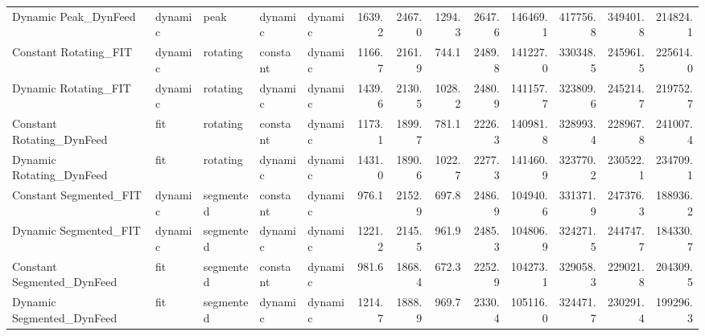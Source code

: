 \begin{tabular}{lllllrrrrrrrr}
Dynamic Peak\_DynFeed         &  dynamic &         peak &   dynamic &     dynamic &        1639.2 &        2467.0 &        1294.3 &            2647.6 &    146469.1 &      417756.8 &         349401.8 &   214824.1 \\
Constant Rotating\_FIT        &  dynamic &     rotating &  constant &     dynamic &        1166.7 &        2161.9 &         744.1 &            2489.8 &    141227.0 &      330348.5 &         245961.5 &   225614.0 \\
Dynamic Rotating\_FIT         &  dynamic &     rotating &   dynamic &     dynamic &        1439.6 &        2130.5 &        1028.2 &            2480.9 &    141157.7 &      323809.6 &         245214.7 &   219752.7 \\
Constant Rotating\_DynFeed    &      fit &     rotating &  constant &     dynamic &        1173.1 &        1899.7 &         781.1 &            2226.3 &    140981.8 &      328993.4 &         228967.8 &   241007.4 \\
Dynamic Rotating\_DynFeed     &      fit &     rotating &   dynamic &     dynamic &        1431.0 &        1890.6 &        1022.7 &            2277.3 &    141460.9 &      323770.2 &         230522.1 &   234709.1 \\
Constant Segmented\_FIT       &  dynamic &    segmented &  constant &     dynamic &         976.1 &        2152.9 &         697.8 &            2486.9 &    104940.6 &      331371.9 &         247376.3 &   188936.2 \\
Dynamic Segmented\_FIT        &  dynamic &    segmented &   dynamic &     dynamic &        1221.2 &        2145.5 &         961.9 &            2485.3 &    104806.9 &      324271.5 &         244747.7 &   184330.7 \\
Constant Segmented\_DynFeed   &      fit &    segmented &  constant &     dynamic &         981.6 &        1868.4 &         672.3 &            2252.9 &    104273.1 &      329058.3 &         229021.8 &   204309.5 \\
Dynamic Segmented\_DynFeed    &      fit &    segmented &   dynamic &     dynamic &        1214.7 &        1888.9 &         969.7 &            2330.4 &    105116.0 &      324471.7 &         230291.4 &   199296.3 \\
\bottomrule
\end{tabular}
